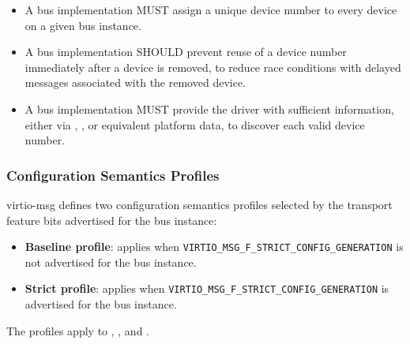\begin{itemize}
  \item A bus implementation MUST assign a unique device number to every
        device on a given bus instance.
  \item A bus implementation SHOULD prevent reuse of a device number
        immediately after a device is removed, to reduce race conditions with
        delayed messages associated with the removed device.
  \item A bus implementation MUST provide the driver with sufficient
        information, either via , ,
        or equivalent platform data, to discover each valid device number.
\end{itemize}

\subsubsection{Configuration Semantics Profiles}
\label{sec:Virtio Transport Options / Virtio Over Messages / Basic Concepts / Configuration Semantics Profiles}

virtio-msg defines two configuration semantics profiles selected by the
transport feature bits advertised for the bus instance:
\begin{itemize}
  \item \textbf{Baseline profile}: applies when
        \texttt{VIRTIO\_MSG\_F\_STRICT\_CONFIG\_GENERATION} is not advertised for
        the bus instance.
  \item \textbf{Strict profile}: applies when
        \texttt{VIRTIO\_MSG\_F\_STRICT\_CONFIG\_GENERATION} is advertised for the
        bus instance.
\end{itemize}

The profiles apply to , , and
.

